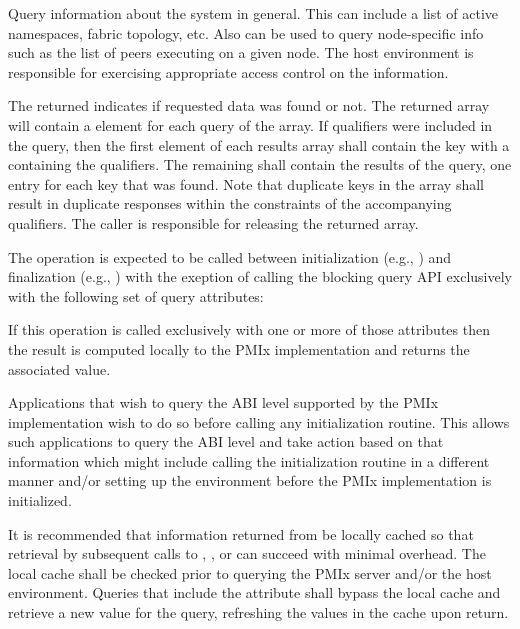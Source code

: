 \descr

Query information about the system in general.
This can include a list of active namespaces, fabric topology, etc.
Also can be used to query node-specific info such as the list of peers executing on a given node. The host environment is responsible for exercising appropriate access control on the information.

The returned  indicates if requested data was found or not. The returned  array will contain a  element for each query of the  array. If qualifiers were included in the query, then the first element of each results array shall contain the  key with a  containing the qualifiers. The remaining  shall contain the results of the query, one entry for each key that was found. Note that duplicate keys in the  array shall result in duplicate responses within the constraints of the accompanying qualifiers. The caller is responsible for releasing the returned array.

The  operation is expected to be called between initialization (e.g., ) and finalization (e.g., ) with the exeption of calling the blocking query \ac{API} exclusively with the following set of query attributes:
\begin{compactitem}
\item {}
\item {}
\end{compactitem}
If this operation is called exclusively with one or more of those attributes then the result is computed locally to the \ac{PMIx} implementation and returns the associated value.

\rationalestart
Applications that wish to query the \ac{ABI} level supported by the \ac{PMIx} implementation wish to do so before calling any initialization routine.
This allows such applications to query the \ac{ABI} level and take action based on that information which might include calling the initialization routine in a different manner and/or setting up the environment before the \ac{PMIx} implementation is initialized.
\rationaleend

\adviceimplstart
It is recommended that information returned from  be locally cached so that retrieval by subsequent calls to , , or  can succeed with minimal overhead. The local cache shall be checked prior to querying the \ac{PMIx} server and/or the host environment. Queries that include the  attribute shall bypass the local cache and retrieve a new value for the query, refreshing the values in the cache upon return.
\adviceimplend


